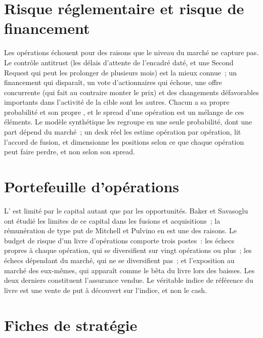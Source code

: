 \section{Risque réglementaire et risque de financement}

Les opérations échouent pour des raisons que le niveau du marché ne capture pas. Le contrôle antitrust (les délais d'attente de l'encadré daté, et une Second Request qui peut les prolonger
de plusieurs mois) est la mieux connue~; un financement qui disparaît, un vote d'actionnaires qui échoue, une offre concurrente (qui fait au contraire monter le prix) et des changements défavorables importants
dans l'activité de la cible sont les autres. Chacun a sa propre probabilité et son propre , et le spread d'une opération est un mélange de ces éléments. Le
modèle synthétique les regroupe en une seule probabilité, dont une part dépend du marché~; un desk réel les estime opération par opération, lit l'accord de fusion, et dimensionne les positions
selon ce que chaque opération peut faire perdre, et non selon son spread.

\section{Portefeuille d'opérations}

L' est limité par le capital autant que par les opportunités. Baker et Savasoglu ont étudié les limites de ce capital dans
les fusions et acquisitions~; la rémunération de type put de Mitchell et Pulvino en est une des raisons. Le budget de risque d'un livre d'opérations comporte trois postes~: les échecs propres à chaque opération,
qui se diversifient sur vingt opérations ou plus~; les échecs dépendant du marché, qui ne se diversifient pas~; et l'exposition au marché des  eux-mêmes, qui
apparaît comme le bêta du livre lors des baisses. Les deux derniers constituent l'assurance vendue. Le véritable indice de référence du livre est une vente de put à découvert sur l'indice, et non le cash.

\section{Fiches de stratégie}

